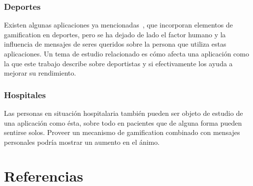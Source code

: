 \documentclass[12pt,letterpaper]{report}
\begin{document}
\subsubsection{Deportes}

Existen algunas aplicaciones ya mencionadas~\cite{zombiesrun},
que incorporan elementos de gamification en deportes, pero se ha
dejado de lado el factor humano y la influencia de mensajes de seres
queridos sobre la persona que utiliza estas aplicaciones. Un tema de
estudio relacionado es cómo afecta una aplicación como la que este
trabajo describe sobre deportistas y si efectivamente los ayuda a
mejorar su rendimiento.

\subsubsection{Hospitales}

Las personas en situación hospitalaria también pueden ser objeto de
estudio de una aplicación como ésta, sobre todo en pacientes que de
alguna forma pueden sentirse solos. Proveer un mecanismo de
gamification combinado con mensajes personales podría mostrar un
aumento en el ánimo.

\newpage
\section{Referencias}
\printbibliography[heading=none]
\end{document}
